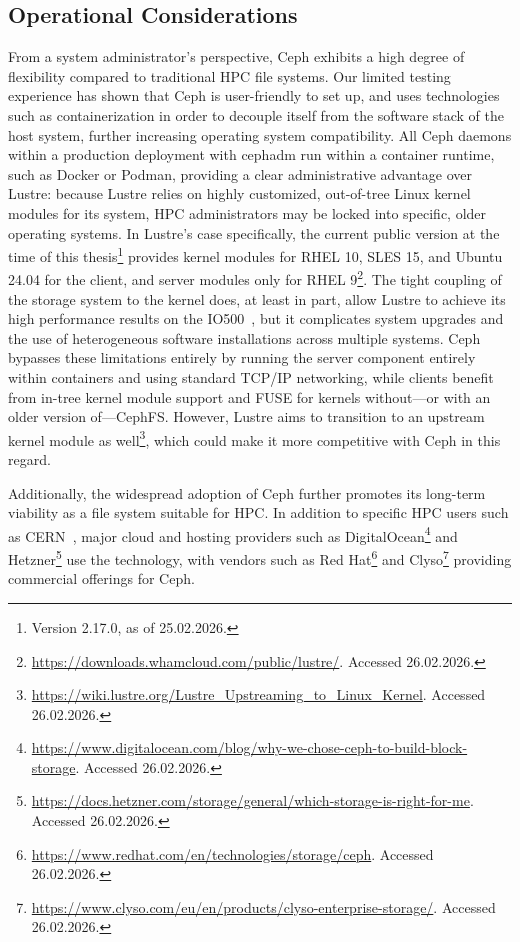 \subsection{Operational Considerations}

From a system administrator's perspective, Ceph exhibits a high degree of flexibility compared to traditional \ac{HPC} file systems. Our limited testing experience has shown that Ceph is user-friendly to set up, and uses technologies such as containerization in order to decouple itself from the software stack of the host system, further increasing operating system compatibility. All Ceph daemons within a production deployment with cephadm run within a container runtime, such as Docker or Podman, providing a clear administrative advantage over Lustre: because Lustre relies on highly customized, out-of-tree Linux kernel modules for its system, \ac{HPC} administrators may be locked into specific, older operating systems. In Lustre's case specifically, the current public version at the time of this thesis\footnote{Version 2.17.0, as of 25.02.2026.} provides kernel modules for \ac{RHEL} 10, \ac{SLES} 15, and Ubuntu 24.04 for the client, and server modules only for \ac{RHEL} 9\footnote{\url{https://downloads.whamcloud.com/public/lustre/}. Accessed 26.02.2026.}. The tight coupling of the storage system to the kernel does, at least in part, allow Lustre to achieve its high performance results on the IO500~\cite{io500-full-list}, but it complicates system upgrades and the use of heterogeneous software installations across multiple systems. Ceph bypasses these limitations entirely by running the server component entirely within containers and using standard \ac{TCP/IP} networking, while clients benefit from in-tree kernel module support and \ac{FUSE} for kernels without---or with an older version of---\ac{CephFS}. However, Lustre aims to transition to an upstream kernel module as well\footnote{\url{https://wiki.lustre.org/Lustre_Upstreaming_to_Linux_Kernel}. Accessed 26.02.2026.}, which could make it more competitive with Ceph in this regard.

Additionally, the widespread adoption of Ceph further promotes its long-term viability as a file system suitable for \ac{HPC}. In addition to specific \ac{HPC} users such as CERN~\cite{cern-evaluating-cephfs-perf}, major cloud and hosting providers such as DigitalOcean\footnote{\url{https://www.digitalocean.com/blog/why-we-chose-ceph-to-build-block-storage}. Accessed 26.02.2026.} and Hetzner\footnote{\url{https://docs.hetzner.com/storage/general/which-storage-is-right-for-me}. Accessed 26.02.2026.} use the technology, with vendors such as Red Hat\footnote{\url{https://www.redhat.com/en/technologies/storage/ceph}. Accessed 26.02.2026.} and Clyso\footnote{\url{https://www.clyso.com/eu/en/products/clyso-enterprise-storage/}. Accessed 26.02.2026.} providing commercial offerings for Ceph.


